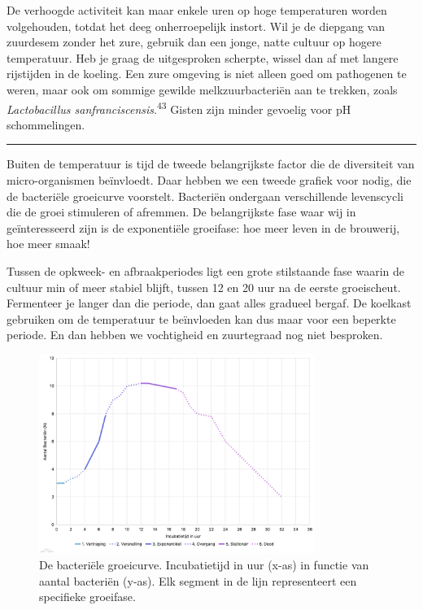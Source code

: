 \documentclass[
  11pt,
  dutch,
]{memoir}
\begin{document}
De verhoogde activiteit kan maar enkele uren op hoge temperaturen worden
volgehouden, totdat het deeg onherroepelijk instort. Wil je de diepgang
van zuurdesem zonder het zure, gebruik dan een jonge, natte cultuur op
hogere temperatuur. Heb je graag de uitgesproken scherpte, wissel dan af
met langere rijstijden in de koeling. Een zure omgeving is niet alleen
goed om pathogenen te weren, maar ook om sommige gewilde
melkzuurbacteriën aan te trekken, zoals \emph{Lactobacillus
sanfranciscensis}.\textsuperscript{43} Gisten zijn minder gevoelig voor
pH schommelingen.

\pfbreak

Buiten de temperatuur is tijd de tweede belangrijkste factor die de
diversiteit van micro-organismen beïnvloedt. Daar hebben we een tweede
grafiek voor nodig, die de bacteriële groeicurve voorstelt. Bacteriën
ondergaan verschillende levenscycli die de groei stimuleren of afremmen.
De belangrijkste fase waar wij in geïnteresseerd zijn is de exponentiële
groeifase: hoe meer leven in de brouwerij, hoe meer smaak!

Tussen de opkweek- en afbraakperiodes ligt een grote stilstaande fase
waarin de cultuur min of meer stabiel blijft, tussen 12 en 20 uur na de
eerste groeischeut. Fermenteer je langer dan die periode, dan gaat alles
gradueel bergaf. De koelkast gebruiken om de temperatuur te beïnvloeden
kan dus maar voor een beperkte periode. En dan hebben we vochtigheid en
zuurtegraad nog niet besproken.

\begin{figure}
\centering
\includegraphics[width=0.8\textwidth,height=\textheight]{img/bacterial_growth_curve.png}
\caption{De bacteriële groeicurve. Incubatietijd in uur (x-as) in
functie van aantal bacteriën (y-as). Elk segment in de lijn
representeert een specifieke groeifase.}
\end{figure}
\end{document}
